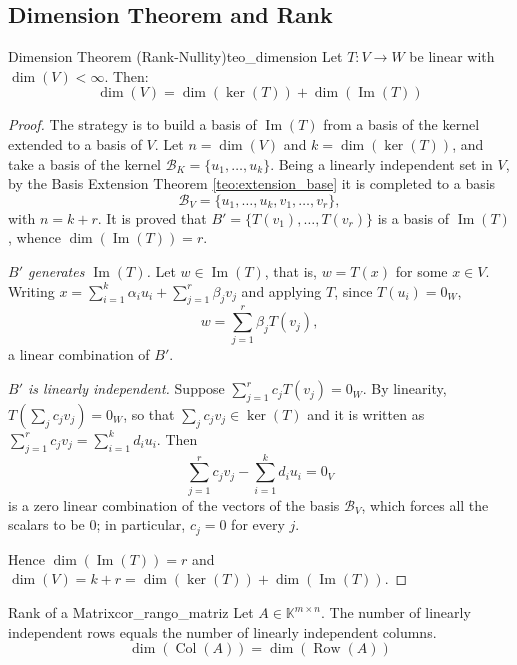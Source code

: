 \documentclass[11pt, a4paper]{article}
\begin{document}
\subsection{Dimension Theorem and Rank}

\begin{teorema}{Dimension Theorem (Rank-Nullity)}{teo_dimension}
Let $T: V \to W$ be linear with $\dim(V) < \infty$. Then:
\[ \dim(V) = \dim(\ker(T)) + \dim(\operatorname{Im}(T)) \]
\end{teorema}

\begin{proof}
The strategy is to build a basis of $\operatorname{Im}(T)$ from a basis of the kernel extended to a basis of $V$. Let $n = \dim(V)$ and $k = \dim(\ker(T))$, and take a basis of the kernel $\mathcal{B}_K = \{u_1, \dots, u_k\}$. Being a linearly independent set in $V$, by the Basis Extension Theorem \ref{teo:extension_base} it is completed to a basis
\[ \mathcal{B}_V = \{u_1, \dots, u_k, v_1, \dots, v_r\}, \]
with $n = k + r$. It is proved that $B' = \{T(v_1), \dots, T(v_r)\}$ is a basis of $\operatorname{Im}(T)$, whence $\dim(\operatorname{Im}(T)) = r$.

\textit{$B'$ generates $\operatorname{Im}(T)$.} Let $w \in \operatorname{Im}(T)$, that is, $w = T(x)$ for some $x \in V$. Writing $x = \sum_{i=1}^k \alpha_i u_i + \sum_{j=1}^r \beta_j v_j$ and applying $T$, since $T(u_i) = 0_W$,
\[ w = \sum_{j=1}^r \beta_j T(v_j), \]
a linear combination of $B'$.

\textit{$B'$ is linearly independent.} Suppose $\sum_{j=1}^r c_j T(v_j) = 0_W$. By linearity, $T(\sum_j c_j v_j) = 0_W$, so that $\sum_j c_j v_j \in \ker(T)$ and it is written as $\sum_{j=1}^r c_j v_j = \sum_{i=1}^k d_i u_i$. Then
\[ \sum_{j=1}^r c_j v_j - \sum_{i=1}^k d_i u_i = 0_V \]
is a zero linear combination of the vectors of the basis $\mathcal{B}_V$, which forces all the scalars to be $0$; in particular, $c_j = 0$ for every $j$.

Hence $\dim(\operatorname{Im}(T)) = r$ and $\dim(V) = k + r = \dim(\ker(T)) + \dim(\operatorname{Im}(T))$.
\end{proof}

\begin{corolario}{Rank of a Matrix}{cor_rango_matriz}
Let $A \in \mathbb{K}^{m \times n}$. The number of linearly independent rows equals the number of linearly independent columns.
\[ \dim(\operatorname{Col}(A)) = \dim(\operatorname{Row}(A)) \]
\end{corolario}
\end{document}
